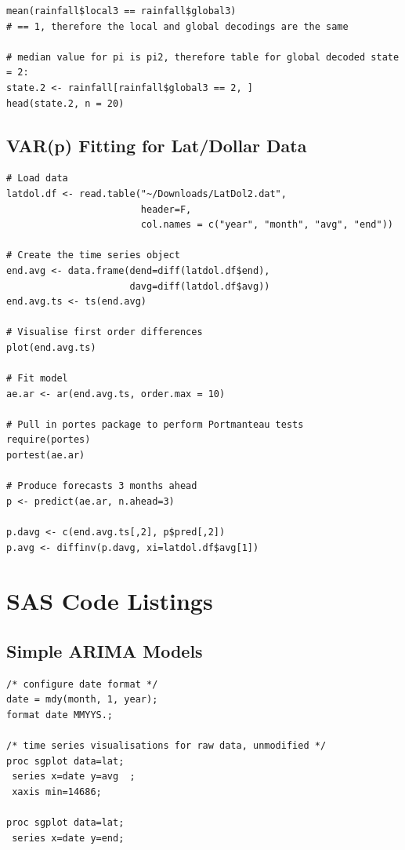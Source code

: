 \documentclass{article}
\begin{document}
\begin{appendices}
\begin{verbatim}
mean(rainfall$local3 == rainfall$global3)
# == 1, therefore the local and global decodings are the same

# median value for pi is pi2, therefore table for global decoded state = 2:
state.2 <- rainfall[rainfall$global3 == 2, ]
head(state.2, n = 20)
\end{verbatim}

\subsection{VAR(p) Fitting for Lat/Dollar Data}\label{apdx:lat_var}

\begin{verbatim}
# Load data
latdol.df <- read.table("~/Downloads/LatDol2.dat",
                        header=F,
                        col.names = c("year", "month", "avg", "end"))

# Create the time series object
end.avg <- data.frame(dend=diff(latdol.df$end),
                      davg=diff(latdol.df$avg))
end.avg.ts <- ts(end.avg)

# Visualise first order differences
plot(end.avg.ts)

# Fit model
ae.ar <- ar(end.avg.ts, order.max = 10)

# Pull in portes package to perform Portmanteau tests
require(portes)
portest(ae.ar)

# Produce forecasts 3 months ahead
p <- predict(ae.ar, n.ahead=3)

p.davg <- c(end.avg.ts[,2], p$pred[,2])
p.avg <- diffinv(p.davg, xi=latdol.df$avg[1])
\end{verbatim}

\section{SAS Code Listings}

\subsection{Simple ARIMA Models}\label{apdx:lat_arima}

\begin{verbatim}
/* configure date format */
date = mdy(month, 1, year);
format date MMYYS.;

/* time series visualisations for raw data, unmodified */
proc sgplot data=lat;
 series x=date y=avg  ;
 xaxis min=14686;

proc sgplot data=lat;
 series x=date y=end;


\end{verbatim}
\end{appendices}
\end{document}
